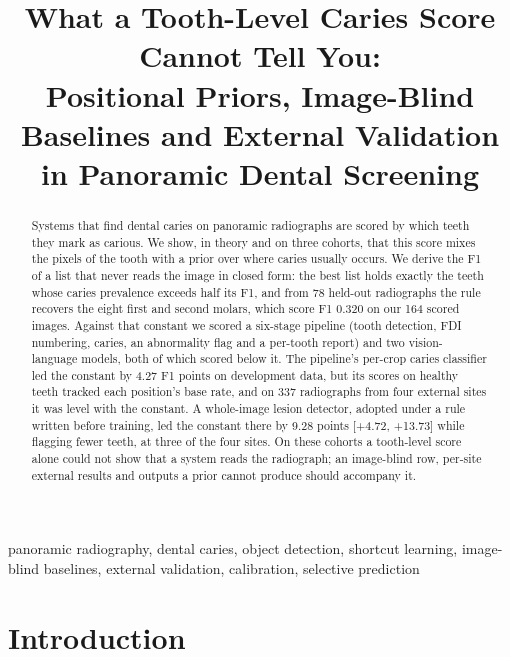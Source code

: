 \documentclass[conference]{IEEEtran}
\begin{document}
\title{What a Tooth-Level Caries Score Cannot Tell You:\\ Positional Priors, Image-Blind Baselines and External Validation in Panoramic Dental Screening}
\author{
}
\maketitle
\begin{abstract}
Systems that find dental caries on panoramic radiographs are scored by which teeth they mark as carious. We show, in theory and on three cohorts, that this score mixes the pixels of the tooth with a prior over where caries usually occurs. We derive the F1 of a list that never reads the image in closed form: the best list holds exactly the teeth whose caries prevalence exceeds half its F1, and from 78 held-out radiographs the rule recovers the eight first and second molars, which score F1 0.320 on our 164 scored images. Against that constant we scored a six-stage pipeline (tooth detection, FDI numbering, caries, an abnormality flag and a per-tooth report) and two vision-language models, both of which scored below it. The pipeline's per-crop caries classifier led the constant by 4.27 F1 points on development data, but its scores on healthy teeth tracked each position's base rate, and on 337 radiographs from four external sites it was level with the constant. A whole-image lesion detector, adopted under a rule written before training, led the constant there by 9.28 points [+4.72, +13.73] while flagging fewer teeth, at three of the four sites. On these cohorts a tooth-level score alone could not show that a system reads the radiograph; an image-blind row, per-site external results and outputs a prior cannot produce should accompany it.
\end{abstract}
\begin{IEEEkeywords}
panoramic radiography, dental caries, object detection, shortcut learning, image-blind baselines, external validation, calibration, selective prediction
\end{IEEEkeywords}

\section{Introduction}
\end{document}
